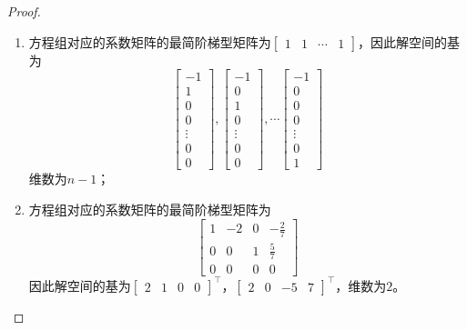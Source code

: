 \begin{proof}
    \begin{enumerate}
        \item {
              方程组对应的系数矩阵的最简阶梯型矩阵为\(\begin{bmatrix}1&1&\cdots&1\end{bmatrix}\)，因此解空间的基为
              \begin{equation*}
                  \begin{bmatrix}-1\\1\\0\\0\\\vdots\\0\\0\end{bmatrix},
                  \begin{bmatrix}-1\\0\\1\\0\\\vdots\\0\\0\end{bmatrix},\cdots
                  \begin{bmatrix}-1\\0\\0\\0\\\vdots\\0\\1\end{bmatrix}
              \end{equation*}
              维数为\(n-1\)；
              }
        \item {
              方程组对应的系数矩阵的最简阶梯型矩阵为
              \begin{equation*}
                  \begin{bmatrix}
                      1 & -2 & 0 & -\frac{2}{7} \\
                      0 & 0  & 1 & \frac{5}{7}  \\
                      0 & 0  & 0 & 0
                  \end{bmatrix}
              \end{equation*}
              因此解空间的基为\(\begin{bmatrix}2&1&0&0\end{bmatrix}^\top\)，\(\begin{bmatrix}2&0&-5&7\end{bmatrix}^\top\)，维数为\(2\)。
              }
    \end{enumerate}
\end{proof}

